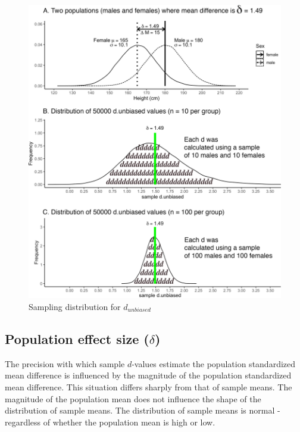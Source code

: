 \documentclass[
]{krantz}
\begin{document}
\begin{figure}
\includegraphics[width=0.8\linewidth]{ch_samples_precision/images/d_distribs2} \caption{Sampling distribution for $d_{unbiased}$}\label{fig:ddistributions}
\end{figure}

\newpage

\hypertarget{population-effect-size-delta}{%
\subsection{\texorpdfstring{Population effect size (\(\delta\))}{Population effect size (\textbackslash delta)}}\label{population-effect-size-delta}}

The precision with which sample \(d\)-values estimate the population standardized mean difference is influenced by the magnitude of the population standardized mean difference. This situation differs sharply from that of sample means. The magnitude of the population mean does not influence the shape of the distribution of sample means. The distribution of sample means is normal - regardless of whether the population mean is high or low.
\end{document}
